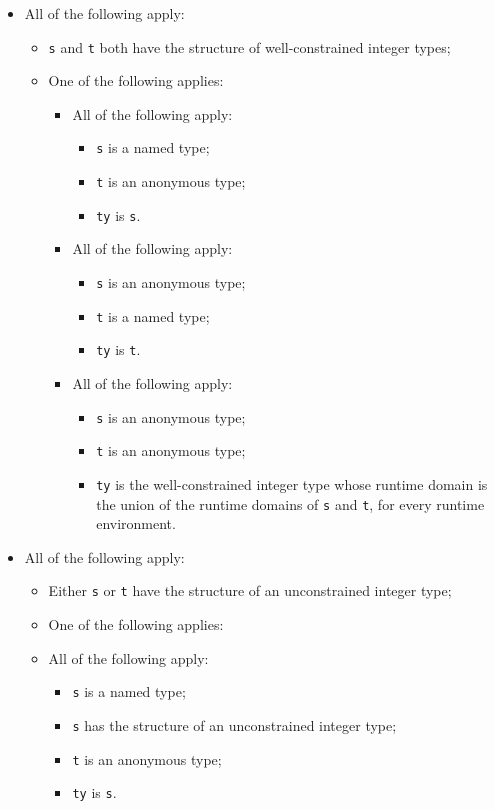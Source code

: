 \documentclass{book}
\begin{document}
\begin{itemize}
  \item All of the following apply:
    \begin{itemize}
    \item \texttt{s} and \texttt{t} both have the structure of well-constrained integer types;
    \item One of the following applies:
      \begin{itemize}
      \item All of the following apply:
        \begin{itemize}
        \item \texttt{s} is a named type;
        \item \texttt{t} is an anonymous type;
        \item \texttt{ty} is \texttt{s}.
        \end{itemize}

      \item All of the following apply:
        \begin{itemize}
        \item \texttt{s} is an anonymous type;
        \item \texttt{t} is a named type;
        \item \texttt{ty} is \texttt{t}.
        \end{itemize}

      \item All of the following apply:
        \begin{itemize}
        \item \texttt{s} is an anonymous type;
        \item \texttt{t} is an anonymous type;
	\item \texttt{ty} is the well-constrained integer type whose runtime domain is the union of the
	  runtime domains of \texttt{s} and \texttt{t}, for every runtime environment.
        \end{itemize}
      \end{itemize}
    \end{itemize}

  \item All of the following apply:
    \begin{itemize}
    \item Either \texttt{s} or \texttt{t} have the structure of an unconstrained integer type;
    \item One of the following applies:

      \item All of the following apply:
        \begin{itemize}
        \item \texttt{s} is a named type;
        \item \texttt{s} has the structure of an unconstrained integer type;
        \item \texttt{t} is an anonymous type;
        \item \texttt{ty} is \texttt{s}.
        \end{itemize}


\end{itemize}
\end{itemize}
\end{document}
